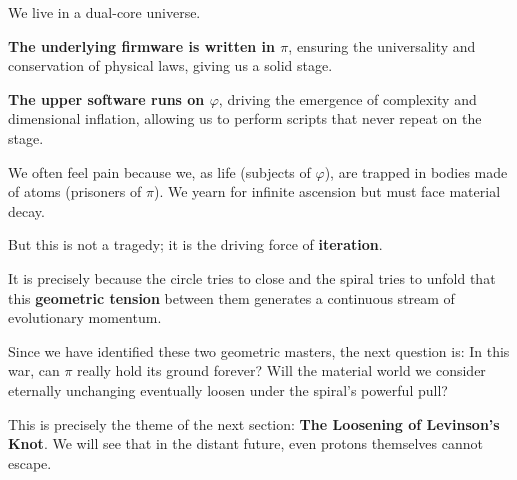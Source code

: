 We live in a dual-core universe.

\textbf{The underlying firmware is written in $\pi$}, ensuring the universality and conservation of physical laws, giving us a solid stage.

\textbf{The upper software runs on $\varphi$}, driving the emergence of complexity and dimensional inflation, allowing us to perform scripts that never repeat on the stage.

We often feel pain because we, as life (subjects of $\varphi$), are trapped in bodies made of atoms (prisoners of $\pi$). We yearn for infinite ascension but must face material decay.

But this is not a tragedy; it is the driving force of \textbf{iteration}.

It is precisely because the circle tries to close and the spiral tries to unfold that this \textbf{geometric tension} between them generates a continuous stream of evolutionary momentum.

Since we have identified these two geometric masters, the next question is: In this war, can $\pi$ really hold its ground forever? Will the material world we consider eternally unchanging eventually loosen under the spiral's powerful pull?

This is precisely the theme of the next section: \textbf{The Loosening of Levinson's Knot}. We will see that in the distant future, even protons themselves cannot escape.

